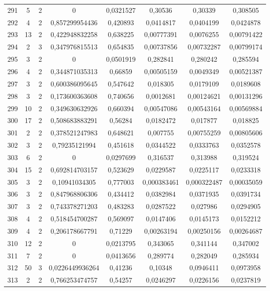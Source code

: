 \begin{longtable}{|c|c|c|c|c|c|c|c|}
291 & 5 & 2 & 0 & 0,0321527 & 0,30536 & 0,30339 & 0,308505  \\
292 & 4 & 2 & 0,857299954436 & 0,420893 & 0,0414817 & 0,0404199 & 0,0424878  \\
293 & 13 & 2 & 0,422948832258 & 0,638225 & 0,00777391 & 0,0076255 & 0,00791422  \\
294 & 2 & 3 & 0,347976815513 & 0,654835 & 0,00737856 & 0,00732287 & 0,00799174  \\
295 & 3 & 2 & 0 & 0,0501919 & 0,282841 & 0,280242 & 0,285594  \\
296 & 4 & 2 & 0,344871035313 & 0,66859 & 0,00505159 & 0,0049349 & 0,00521387  \\
297 & 3 & 2 & 0,600386095645 & 0,547642 & 0,018305 & 0,0179109 & 0,0189608  \\
298 & 3 & 2 & 0,173600363608 & 0,740656 & 0,0012681 & 0,00124621 & 0,00131296  \\
299 & 10 & 2 & 0,349630632926 & 0,660394 & 0,00547086 & 0,00543164 & 0,00569884  \\
300 & 17 & 2 & 0,508683883291 & 0,56284 & 0,0182472 & 0,017877 & 0,018825  \\
301 & 2 & 2 & 0,378521247983 & 0,648621 & 0,007755 & 0,00755259 & 0,00805606  \\
302 & 3 & 2 & 0,79235121994 & 0,451618 & 0,0344522 & 0,0333763 & 0,0352578  \\
303 & 6 & 2 & 0 & 0,0297699 & 0,316537 & 0,313988 & 0,319524  \\
304 & 15 & 2 & 0,692814703157 & 0,523629 & 0,0229587 & 0,0225117 & 0,0233318  \\
305 & 3 & 2 & 0,10941034305 & 0,777003 & 0,000383461 & 0,000322487 & 0,00035059  \\
306 & 3 & 2 & 0,847968806306 & 0,434412 & 0,0382984 & 0,0371935 & 0,0391734  \\
307 & 3 & 2 & 0,743378271203 & 0,483283 & 0,0287522 & 0,027986 & 0,0294905  \\
308 & 4 & 2 & 0,518454700287 & 0,569097 & 0,0147406 & 0,0145173 & 0,0152212  \\
309 & 4 & 2 & 0,206178667791 & 0,71229 & 0,00263194 & 0,00250156 & 0,00264687  \\
310 & 12 & 2 & 0 & 0,0213795 & 0,343065 & 0,341144 & 0,347002  \\
311 & 7 & 2 & 0 & 0,0413656 & 0,289774 & 0,282049 & 0,285934  \\
312 & 50 & 3 & 0,0226449936264 & 0,41236 & 0,10348 & 0,0946411 & 0,0973958  \\
313 & 2 & 2 & 0,766253474757 & 0,54257 & 0,0246297 & 0,0226156 & 0,0237819  \\

\end{longtable}
